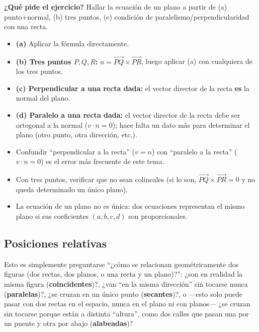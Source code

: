 \documentclass[11pt,a4paper]{article}
\newcommand{\qpide}[1]{\textbf{¿Qué pide el ejercicio?} #1\par}
\begin{document}
\qpide{Hallar la ecuación de un plano a partir de (a) punto+normal, (b) tres puntos, (c)
condición de paralelismo/perpendicularidad con una recta.}

\begin{proc}
\begin{itemize}
    \item \textbf{(a)} Aplicar la fórmula directamente.
    \item \textbf{(b) Tres puntos $P,Q,R$:} $n=\overrightarrow{PQ}\times\overrightarrow{PR}$,
    luego aplicar (a) con cualquiera de los tres puntos.
    \item \textbf{(c) Perpendicular a una recta dada:} el vector director de la recta
    \textbf{es} la normal del plano.
    \item \textbf{(d) Paralelo a una recta dada:} el vector director de la recta debe ser
    ortogonal a la normal ($v\cdot n=0$); hace falta un dato más para determinar el plano
    (otro punto, otra dirección, etc.).
\end{itemize}
\end{proc}

\begin{atencion}
\begin{itemize}
    \item Confundir ``perpendicular a la recta'' ($v=n$) con ``paralelo a la recta''
    ($v\cdot n=0$) es el error más frecuente de este tema.
    \item Con tres puntos, verificar que no sean colineales (si lo son,
    $\overrightarrow{PQ}\times\overrightarrow{PR}=0$ y no queda determinado un único
    plano).
    \item La ecuación de un plano no es única: dos ecuaciones representan el mismo plano
    si sus coeficientes $(a,b,c,d)$ son proporcionales.
\end{itemize}
\end{atencion}

\subsection{Posiciones relativas}

\begin{intuicion}
Esto es simplemente preguntarse ``¿cómo se relacionan geométricamente dos figuras (dos
rectas, dos planos, o una recta y un plano)?'': ¿son en realidad la misma figura
(\textbf{coincidentes})?, ¿van ``en la misma dirección'' sin tocarse nunca
(\textbf{paralelas})?, ¿se cruzan en un único punto (\textbf{secantes})?, o —esto solo
puede pasar con dos rectas en el espacio, nunca en el plano ni con planos— ¿se cruzan sin
tocarse porque están a distinta ``altura'', como dos calles que pasan una por un puente y
otra por abajo (\textbf{alabeadas})?
\end{intuicion}
\end{document}
